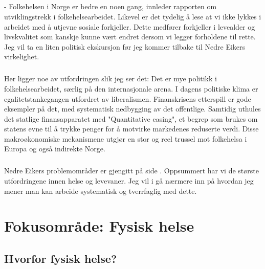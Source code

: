 \documentclass[11pt]{memoir} %
\begin{document}
		\paragraph{}
			- Folkehelsen i Norge er bedre en noen gang, innleder rapporten om utviklingstrekk i folkehelsearbeidet\cite{Utvtrekk}. Likevel er det tydelig å lese at vi ikke lykkes i arbeidet med å utjevne sosiale forkjeller. Dette medfører forkjeller i levealder og livskvalitet som kanskje kunne vært endret dersom vi legger forholdene til rette. Jeg vil ta en liten politisk ekskursjon før jeg kommer tilbake til Nedre Eikers virkelighet.

		\paragraph{}
			Her ligger noe av utfordringen slik jeg ser det: Det er mye politikk i folkehelsearbeidet, særlig på den internasjonale arena. I dagens politiske klima er egalitetstankegangen utfordret av liberalismen. Finanskrisens etterspill er gode eksempler på det, med systematisk nedbygging av det offentlige. Samtidig uthules det statlige finansapparatet med "Quantitative easing", et begrep som brukes om statens evne til å trykke penger for å motvirke markedenes reduserte verdi. Disse makroøkonomiske mekanismene utgjør en stor og reel trussel mot folkehelsa i Europa og også indirekte Norge.

		\paragraph{}
			Nedre Eikers problemområder er gjengitt på side \pageref{fhprofilnekbilde}. Oppsummert har vi de største utfordringene innen helse og levevaner. Jeg vil i  gå nærmere inn på hvordan jeg mener man kan arbeide systematisk og tverrfaglig med dette. 

\chapter{Fokusområde: Fysisk helse}\label{chap:fok}
	\section{Hvorfor fysisk helse?}
\end{document}
